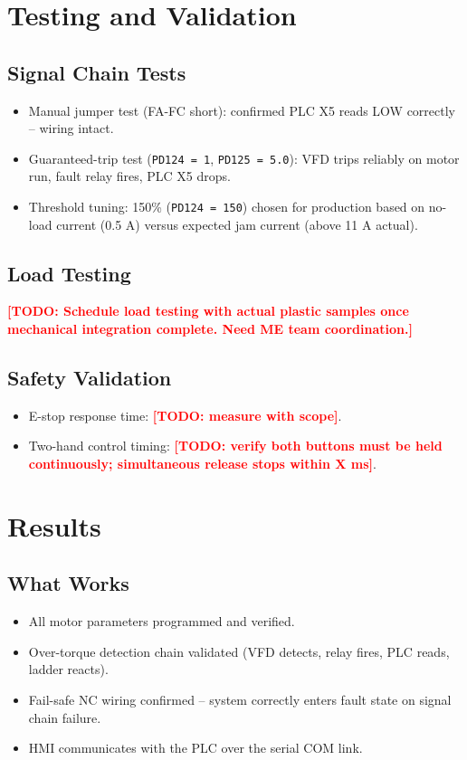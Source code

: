 \documentclass[hidelinks,12pt]{article}
\newcommand{\todo}[1]{\textcolor{red}{\textbf{[TODO: #1]}}}
\begin{document}
\section{Testing and Validation}

\subsection{Signal Chain Tests}
\begin{itemize}
    \item Manual jumper test (FA-FC short): confirmed PLC X5 reads LOW correctly -- wiring intact.
    \item Guaranteed-trip test (\texttt{PD124 = 1}, \texttt{PD125 = 5.0}): VFD trips reliably on motor run, fault relay fires, PLC X5 drops.
    \item Threshold tuning: 150\% (\texttt{PD124 = 150}) chosen for production based on no-load current (0.5 A) versus expected jam current (above 11 A actual).
\end{itemize}

\subsection{Load Testing}
\todo{Schedule load testing with actual plastic samples once mechanical integration complete. Need ME team coordination.}

\subsection{Safety Validation}
\begin{itemize}
    \item E-stop response time: \todo{measure with scope}.
    \item Two-hand control timing: \todo{verify both buttons must be held continuously; simultaneous release stops within X ms}.
\end{itemize}

\section{Results}

\subsection{What Works}
\begin{itemize}
    \item All motor parameters programmed and verified.
    \item Over-torque detection chain validated (VFD detects, relay fires, PLC reads, ladder reacts).
    \item Fail-safe NC wiring confirmed -- system correctly enters fault state on signal chain failure.
    \item HMI communicates with the PLC over the serial COM link.
\end{itemize}
\end{document}
